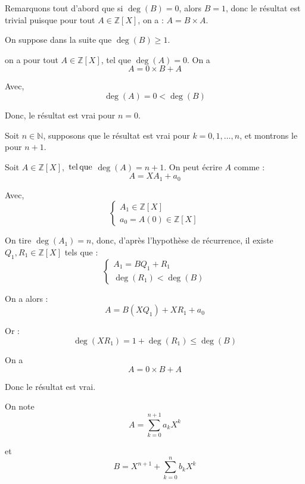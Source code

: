 Remarquons tout d'abord que si $\deg (B) = 0$, alors $B = 1$, donc le
r{\'e}sultat est trivial puisque pour tout $A \in \mathbb{Z} [X]$, on a : $A =
B \times A$.

On suppose dans la suite que $\deg (B) \geqslant 1$.

 on a pour tout $A \in \mathbb{Z} [X]$, tel que $\deg
(A) = 0$. On a
\[ A = 0 \times B + A \]


Avec,
\[ \deg (A) = 0 < \deg (B) \]


Donc, le r{\'e}sultat est vrai pour $n = 0$.

Soit $n \in \mathbb{N}$, supposons que le r{\'e}sultat est vrai pour $k = 0,
1, \ldots, n$, et montrons le pour $n + 1$.

Soit $A \in \mathbb{Z} [X],$ $\operatorname{tel} \operatorname{que}$ $\deg (A) = n + 1$. On
peut {\'e}crire $A$ comme :
\[ A = X A_1 + a_0 \]


Avec,
\[ \left\{\begin{array}{l}
     A_1 \in \mathbb{Z} [X]\\
     a_0 = A (0) \in \mathbb{Z} [X]
   \end{array}\right. \]


On tire $\deg (A_1) = n$, donc, d'apr{\`e}s l'hypoth{\`e}se de r{\'e}currence,
il existe $Q_1, R_1 \in \mathbb{Z} [X]$ tels que :
\[ \left\{\begin{array}{l}
     A_1 = B Q_1 + R_1\\
     \deg (R_1) < \deg (B)
   \end{array}\right. \]


On a alors :
\begin{equation}
  A = B (X Q_1) + X R_1 + a_0
\end{equation}


Or :
\begin{equation}
  \deg (X R_1) = 1 + \deg (R_1) \leqslant \deg (B)
\end{equation}




On a
\[ A = 0 \times B + A \]


Donc le r{\'e}sultat est vrai.


On note
\[ A = \underset{k = 0}{\overset{n + 1}{\sum}} a_k X^k \]


et
\[ B = X^{n + 1} + \underset{k = 0}{\overset{n}{\sum}} b_k X^k \]


